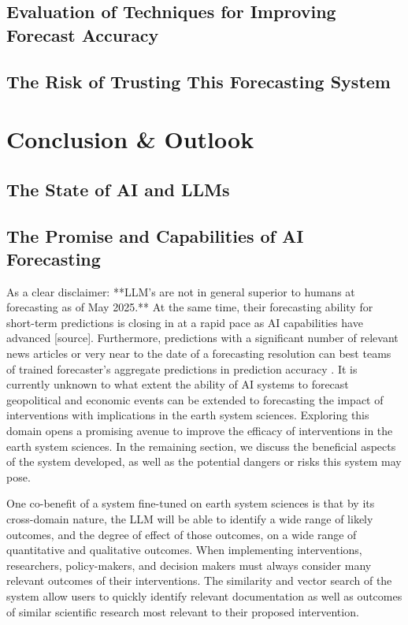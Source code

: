 \documentclass[12pt,a4paper]{article}
\begin{document}
\subsection{Evaluation of Techniques for Improving Forecast Accuracy}
\subsection{The Risk of Trusting This Forecasting System}
\clearpage
\section{Conclusion \& Outlook}
\subsection{The State of AI and LLMs}
\subsection{The Promise and Capabilities of AI Forecasting}

As a clear disclaimer: **LLM's are not in general superior to humans at forecasting as of May 2025.** At the same time, their forecasting ability for short-term predictions is closing in at a rapid pace as AI capabilities have advanced [source]. Furthermore, predictions with a significant number of relevant news articles or very near to the date of a forecasting resolution can best teams of trained forecaster's aggregate predictions in prediction accuracy . It is currently unknown to what extent the ability of AI systems to forecast geopolitical and economic events can be extended to forecasting the impact of interventions with implications in the earth system sciences. Exploring this domain opens a promising avenue to improve the efficacy of interventions in the earth system sciences. In the remaining section, we discuss the beneficial aspects of the system developed, as well as the potential dangers or risks this system may pose.

One co-benefit of a system fine-tuned on earth system sciences is that by its cross-domain nature, the LLM will be able to identify a wide range of likely outcomes, and the degree of effect of those outcomes, on a wide range of quantitative and qualitative outcomes. When implementing interventions, researchers, policy-makers, and decision makers must always consider many relevant outcomes of their interventions. The similarity and vector search of the system allow users to quickly identify relevant documentation as well as outcomes of similar scientific research most relevant to their proposed intervention.
\end{document}

